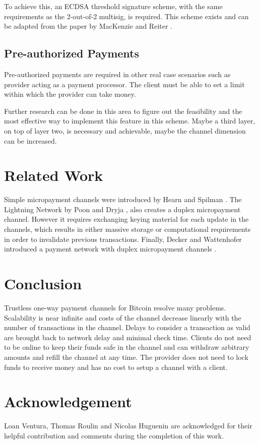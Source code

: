 \documentclass{llncs}
\begin{document}
To achieve this, an ECDSA threshold signature scheme, with the same requirements
as the 2-out-of-2 multisig, is required. This scheme exists and can be adapted
from the paper  by MacKenzie and
Reiter \cite{10.1007/3-540-44647-8_8}.

\subsection{Pre-authorized Payments} Pre-authorized payments are required in
other real case scenarios such as provider acting as a payment processor. The
client must be able to set a limit within which the provider can take money.

Further research can be done in this area to figure out the feasibility and the
most effective way to implement this feature in this scheme. Maybe a third
layer, on top of layer two, is necessary and achievable, maybe the channel
dimension can be increased.

\section{Related Work} Simple micropayment channels were introduced by Hearn and
Spilman \cite{Bitcoin_contracts}. The Lightning Network by Poon and Dryja
\cite{lightningNetwork}, also creates a duplex micropayment channel. However it
requires exchanging keying material for each update in the channels, which
results in either massive storage or computational requirements in order to
invalidate previous transactions. Finally, Decker and Wattenhofer introduced a
payment network with duplex micropayment channels
\cite{10.1007/978-3-319-21741-3_1}.

\section{Conclusion} Trustless one-way payment channels for Bitcoin resolve many
problems. Scalability is near infinite and costs of the channel decrease
linearly with the number of transactions in the channel. Delays to consider a
transaction as valid are brought back to network delay and minimal check time.
Clients do not need to be online to keep their funds safe in the channel and can
withdraw arbitrary amounts and refill the channel at any time. The provider does
not need to lock funds to receive money and has no cost to setup a channel with
a client.

\section{Acknowledgement} Loan Ventura, Thomas Roulin and Nicolas Huguenin are
acknowledged for their helpful contribution and comments during the completion
of this work.
\end{document}

